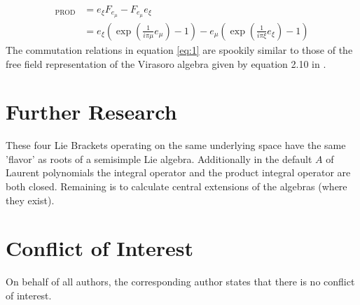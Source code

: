 \documentclass{artjlt}
\newcommand{\?}{\textbackslash}
\begin{document}
      \begin{align}
          [e_\xi, e_\mu]_\text{PROD} &= e_\xi F_{e_{\mu}} - F_{e_{\mu}} e_{\xi} \nonumber \\
          &= e_\xi (\exp(\frac{1}{i \pi \mu} e_\mu) - 1) - e_\mu(\exp(\frac{1}{i \pi \xi} e_\xi) -1) \label{eq:1}
      \end{align}
      The commutation relations in equation \ref{eq:1} are spookily similar to those of the free field representation of the Virasoro algebra given by equation 2.10 in \cite{teschner2017guidetwodimensionalconformalfield}.
   \section{Further Research}
   These four Lie Brackets operating on the same underlying space have the same 'flavor' as roots of a semisimple Lie algebra. 
   Additionally in the default $A$ of Laurent polynomials the integral operator and the product integral operator are both closed. 
   Remaining is to calculate central extensions of the algebras (where they exist).
\section*{Conflict of Interest}
On behalf of all authors, the corresponding author states that there is no conflict of interest.
\end{document}
